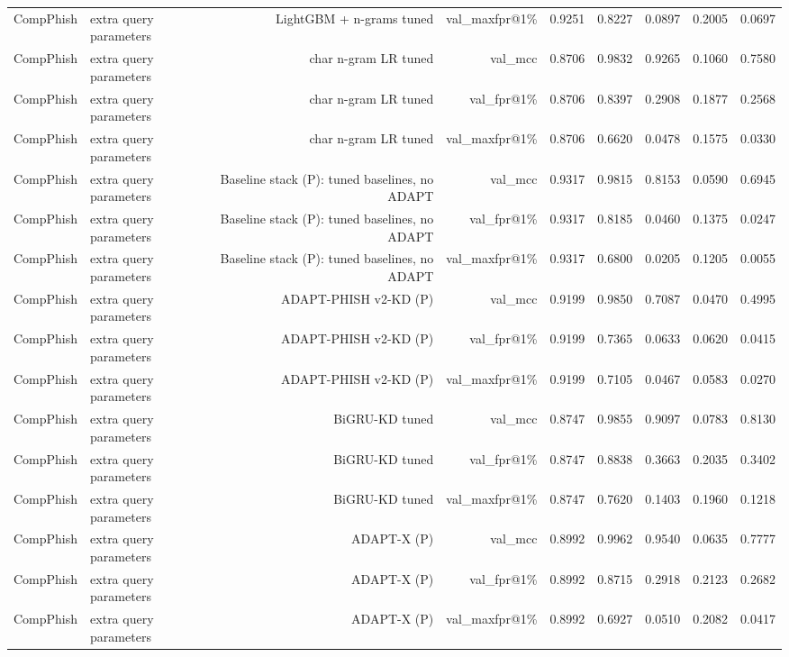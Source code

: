 \begin{table}[t]
\begin{tabular}{llrrrrrrr}
CompPhish & extra query parameters & LightGBM + n-grams tuned & val\_maxfpr@1\% & 0.9251 & 0.8227 & 0.0897 & 0.2005 & 0.0697 \\
CompPhish & extra query parameters & char n-gram LR tuned & val\_mcc & 0.8706 & 0.9832 & 0.9265 & 0.1060 & 0.7580 \\
CompPhish & extra query parameters & char n-gram LR tuned & val\_fpr@1\% & 0.8706 & 0.8397 & 0.2908 & 0.1877 & 0.2568 \\
CompPhish & extra query parameters & char n-gram LR tuned & val\_maxfpr@1\% & 0.8706 & 0.6620 & 0.0478 & 0.1575 & 0.0330 \\
CompPhish & extra query parameters & Baseline stack (P): tuned baselines, no ADAPT & val\_mcc & 0.9317 & 0.9815 & 0.8153 & 0.0590 & 0.6945 \\
CompPhish & extra query parameters & Baseline stack (P): tuned baselines, no ADAPT & val\_fpr@1\% & 0.9317 & 0.8185 & 0.0460 & 0.1375 & 0.0247 \\
CompPhish & extra query parameters & Baseline stack (P): tuned baselines, no ADAPT & val\_maxfpr@1\% & 0.9317 & 0.6800 & 0.0205 & 0.1205 & 0.0055 \\
CompPhish & extra query parameters & ADAPT-PHISH v2-KD (P) & val\_mcc & 0.9199 & 0.9850 & 0.7087 & 0.0470 & 0.4995 \\
CompPhish & extra query parameters & ADAPT-PHISH v2-KD (P) & val\_fpr@1\% & 0.9199 & 0.7365 & 0.0633 & 0.0620 & 0.0415 \\
CompPhish & extra query parameters & ADAPT-PHISH v2-KD (P) & val\_maxfpr@1\% & 0.9199 & 0.7105 & 0.0467 & 0.0583 & 0.0270 \\
CompPhish & extra query parameters & BiGRU-KD tuned & val\_mcc & 0.8747 & 0.9855 & 0.9097 & 0.0783 & 0.8130 \\
CompPhish & extra query parameters & BiGRU-KD tuned & val\_fpr@1\% & 0.8747 & 0.8838 & 0.3663 & 0.2035 & 0.3402 \\
CompPhish & extra query parameters & BiGRU-KD tuned & val\_maxfpr@1\% & 0.8747 & 0.7620 & 0.1403 & 0.1960 & 0.1218 \\
CompPhish & extra query parameters & ADAPT-X (P) & val\_mcc & 0.8992 & 0.9962 & 0.9540 & 0.0635 & 0.7777 \\
CompPhish & extra query parameters & ADAPT-X (P) & val\_fpr@1\% & 0.8992 & 0.8715 & 0.2918 & 0.2123 & 0.2682 \\
CompPhish & extra query parameters & ADAPT-X (P) & val\_maxfpr@1\% & 0.8992 & 0.6927 & 0.0510 & 0.2082 & 0.0417 \\

\end{tabular}
\end{table}
